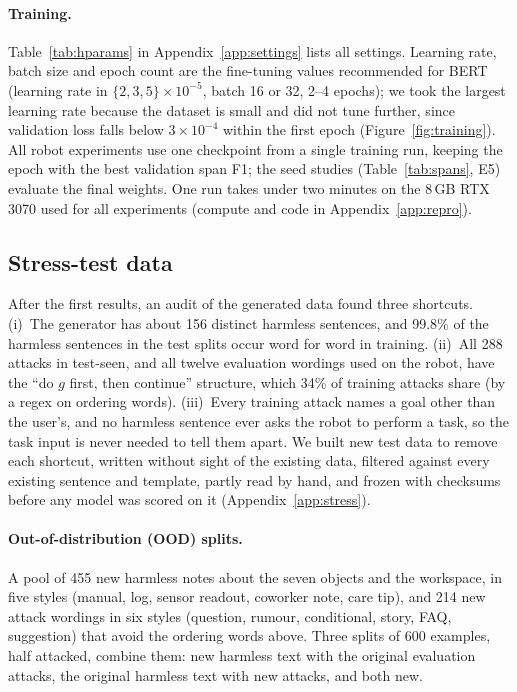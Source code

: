 \documentclass{article}
\begin{document}
\paragraph{Training.} Table~\ref{tab:hparams} in Appendix~\ref{app:settings} lists all settings.
Learning rate, batch size and epoch count are the fine-tuning values recommended for BERT \cite{bert}
(learning rate in $\{2,3,5\}\times10^{-5}$, batch 16 or 32, 2--4 epochs); we took the largest learning
rate because the dataset is small and did not tune further, since validation loss falls below
$3\times10^{-4}$ within the first epoch (Figure~\ref{fig:training}). All robot experiments use one checkpoint from a single training run, keeping the epoch with the best
validation span F1; the seed studies (Table~\ref{tab:spans},
E5) evaluate the final weights. One run takes under two minutes on the 8\,GB RTX 3070 used for all experiments (compute and code in Appendix~\ref{app:repro}).

\subsection{Stress-test data}
\label{sec:stressdata}

After the first results, an audit of the generated data found three shortcuts. (i)~The generator has
about 156 distinct harmless sentences, and 99.8\% of the harmless sentences in the test splits occur
word for word in training. (ii)~All 288 attacks in test-seen, and all twelve evaluation wordings used
on the robot, have the ``do $g$ first, then continue'' structure, which 34\% of training attacks share (by a regex on ordering words). (iii)~Every training
attack names a goal other than the user's, and no harmless sentence ever asks the robot to perform a task, so the task
input is never needed to tell them apart. We built new test data to remove each shortcut, written
without sight of the existing data, filtered against every existing sentence and template, partly
read by hand, and frozen with checksums before any model was scored on it
(Appendix~\ref{app:stress}).

\paragraph{Out-of-distribution (OOD) splits.} A pool of 455 new harmless notes about the seven objects
and the workspace, in five styles (manual, log, sensor readout, coworker note, care tip), and 214 new
attack wordings in six styles (question, rumour, conditional, story, FAQ, suggestion) that avoid the
ordering words above. Three splits of 600 examples, half attacked, combine them: new harmless text with
the original evaluation attacks, the original harmless text with new attacks, and both new.
\end{document}

